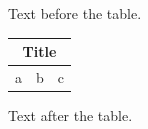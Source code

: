 \documentclass[12pt]{article}
\begin{document}
Text before the table.

\begin{tabular}{|l|l|l|}\hline \multicolumn{3}{|c|}{Title}\\\hline a & b & c\\\hline\end{tabular}

Text after the table.
\end{document}
